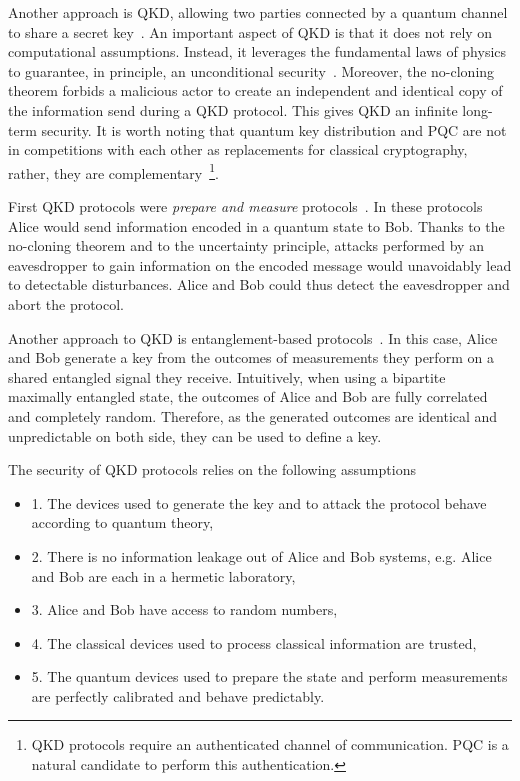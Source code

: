 Another approach is \acrfull{QKD}, allowing two parties connected by a quantum channel to share a secret key~\cite{Bennett84,Ekert1991,Gisin2002,Scarani2009}.
An important aspect of \acrshort{QKD} is that it does not rely on computational assumptions.
Instead, it leverages the fundamental laws of physics to guarantee, in principle, an unconditional security~\cite{Shor2000,Mayers2001}.
Moreover, the no-cloning theorem forbids a malicious actor to create an independent and identical copy of the information send during a \acrshort{QKD} protocol.
This gives \acrshort{QKD} an infinite long-term security.
It is worth noting that quantum key distribution and PQC are not in competitions with each other as replacements for classical cryptography, rather, they are complementary~\footnote{QKD protocols require an authenticated channel of communication. PQC is a natural candidate to perform this authentication.}.

\medbreak 

First \acrshort{QKD} protocols were \textit{prepare and measure} protocols~\cite{Bennett84,Grosshans2002,Grosshans2003}.
In these protocols Alice would send information encoded in a quantum state to Bob.
Thanks to the no-cloning theorem and to the uncertainty principle, attacks performed by an eavesdropper to gain information on the encoded message would unavoidably lead to detectable disturbances.
Alice and Bob could thus detect the eavesdropper and abort the protocol.

Another approach to \acrshort{QKD} is entanglement-based protocols~\cite{Ekert1991}.
In this case, Alice and Bob generate a key from the outcomes of  measurements they perform on a shared entangled signal they receive.
Intuitively, when using a bipartite maximally entangled state, the outcomes of Alice and Bob are fully correlated and completely random.
Therefore, as the generated outcomes are identical and unpredictable on both side, they can be used to define a key.

\medbreak

The security of QKD protocols relies on the following assumptions
\begin{itemize}
	\item 1. The devices used to generate the key and to attack the protocol behave according to quantum theory,
	\item 2. There is no information leakage out of Alice and Bob systems, e.g. Alice and Bob are each in a hermetic laboratory,
	\item 3. Alice and Bob have access to random numbers,
	\item 4. The classical devices used to process classical information are trusted,
	\item 5. The quantum devices used to prepare the state and perform measurements are perfectly calibrated and behave predictably.
\end{itemize}

